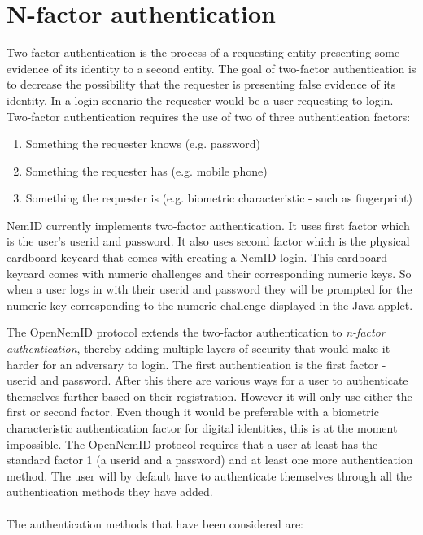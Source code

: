 \documentclass[twosided]{report}
\begin{document}
\section{N-factor authentication}
\label{sect:nfactauth}
Two-factor authentication is the process of a requesting entity presenting some evidence of its identity to a second entity. The goal of two-factor authentication is to decrease the possibility that the requester is presenting false evidence of its identity. In a login scenario the requester would be a user requesting to login. Two-factor authentication requires the use of two of three authentication factors:
\begin{enumerate}
\item Something the requester knows (e.g. password)
\item Something the requester has (e.g. mobile phone)
\item Something the requester is (e.g. biometric characteristic - such as fingerprint)
\end{enumerate}
\par
NemID currently implements two-factor authentication. It uses first factor which is the user's userid and password. It also uses second factor which is the physical cardboard keycard that comes with creating a NemID login. This cardboard keycard comes with numeric challenges and their corresponding numeric keys. So when a user logs in with their userid and password they will be prompted for the numeric key corresponding to the numeric challenge displayed in the Java applet.
\par
The OpenNemID protocol extends the two-factor authentication to \emph{n-factor authentication}, thereby adding multiple layers of security that would make it harder for an adversary to login. The first authentication is the first factor - userid and password. After this there are various ways for a user to authenticate themselves further based on their registration. However it will only use either the first or second factor. Even though it would be preferable with a biometric characteristic authentication factor for digital identities, this is at the moment impossible. The OpenNemID protocol requires that a user at least has the standard factor 1 (a userid and a password) and at least one more authentication method. The user will by default have to authenticate themselves through all the authentication methods they have added.
\\
\\
The authentication methods that have been considered are:
\end{document}
